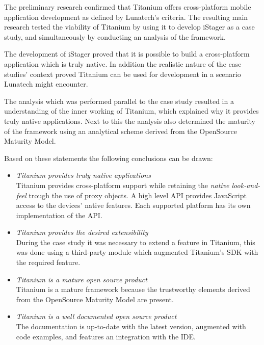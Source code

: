 
The preliminary research confirmed that Titanium offers cross-platform mobile application development as defined by Lunatech's criteria. The resulting main research tested the viability of Titanium by using it to develop iStager as a case study, and simultaneously by conducting an analysis of the framework.

The development of iStager proved that it is possible to build a cross-platform application which is truly native. In addition the realistic nature of the case studies' context proved Titanium can be used for development in a scenario Lunatech might encounter.

The analysis which was performed parallel to the case study resulted in a understanding of the inner working of Titanium, which explained why it provides truly native applications. Next to this the analysis also determined the maturity of the framework using an analytical scheme derived from the OpenSource Maturity Model. 

Based on these statements the following conclusions can be drawn:
\begin{itemize}
\item \emph{Titanium provides truly native applications}\\
Titanium provides cross-platform support while retaining the \emph{native look-and-feel} trough the use of proxy objects.  A high level API provides JavaScript access to the devices' native features. Each supported platform has its own implementation of the API.

\item \emph{Titanium provides the desired extensibility}\\
During the case study it was necessary to extend a feature in Titanium, this was done using a third-party module which augmented Titanium's SDK with the required feature.

\item \emph{Titanium is a mature open source product}\\
Titanium is a mature framework because the trustworthy elements derived from the OpenSource Maturity Model are present.

\item \emph{Titanium is a well documented open source product}\\
The documentation is up-to-date with the latest version, augmented with code examples, and features an integration with the IDE.

\end{itemize}

